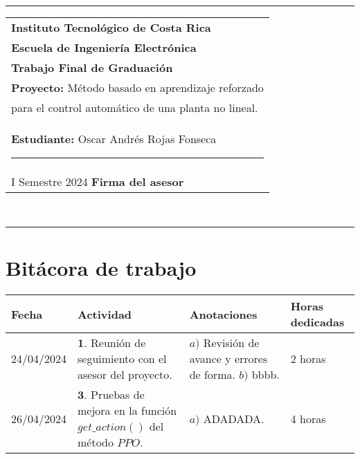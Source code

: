 \documentclass[12pt]{article}
\begin{document}
\hfill\\
\rule{\textwidth}{1.5pt}

\begin{minipage}[t]{85mm}
  \begin{tabular}{l}
    \textbf{\large Instituto Tecnológico de Costa Rica} \\  
    \textbf{Escuela de Ingeniería Electrónica} \\
    \textbf{Trabajo Final de Graduación} \\
    \textbf{Proyecto:} Método basado en aprendizaje reforzado \\para el control automático de una planta no lineal. \\
    \textbf{Estudiante:} Oscar Andrés Rojas Fonseca \hspace{3cm}\rule{4.5cm}{1.5pt}\\
    I Semestre 2024 \hspace{8.5cm}\textbf{Firma del asesor}
  \end{tabular}
\end{minipage}
\hfill\\
\rule{\textwidth}{1.5pt}


\section*{Bitácora de trabajo}

\begin{minipage}[h]{\textwidth}
	\centering
	\begin{tabularx}{\textwidth}{|p{2cm}|X|X|p{2cm}|} 
		\hline
		\rowcolor{encabezado}
		\textbf{Fecha} & 
		\textbf{Actividad} & 
		\textbf{Anotaciones} & 
		\textbf{Horas dedicadas} \\ \hline
	 	24/04/2024 & 
	 	$\mathbf{1}.$ Reunión de seguimiento con el asesor del proyecto. & 
	 	$a)$ Revisión de avance y errores de forma. \newline
	 	$b)$ bbbb. \newline & 
	 	2 horas \\
		26/04/2024 & 
	 	$\mathbf{3}.$ Pruebas de mejora en la función $get\_action()$ del método $PPO$. &
	 	$a)$ ADADADA. \newline & 
	 	4 horas \\

	 	\hline
	\end{tabularx}
\end{minipage}	 	
	 	
\end{document}
